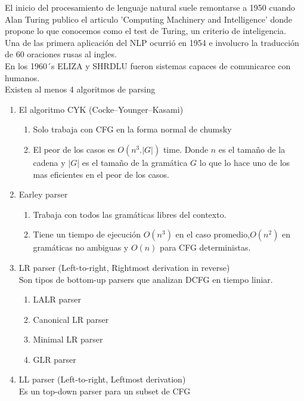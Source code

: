 El inicio del procesamiento de lenguaje natural suele remontarse a 1950 cuando Alan Turing publico el articulo 'Computing Machinery and Intelligence' donde propone lo que conocemos como el test de Turing, un criterio de inteligencia.
\\
Una de las primera aplicación del NLP ocurrió en 1954 e involucro la traducción de 60 oraciones rusas al ingles.
\\
En los 1960´s ELIZA y SHRDLU fueron sistemas capaces de comunicarce con  humanos.
\\
Existen al menos 4 algoritmos de parsing
\begin{enumerate}
    \item El algoritmo CYK (Cocke–Younger–Kasami)
    \begin{enumerate}
        \item Solo trabaja con CFG en la forma normal de chumsky
        \item El peor de los casos es $O(n^3 . |G|)$ time. Donde $n$ es el tamaño de la cadena y $|G|$ es el tamaño de la gramática $G$ lo que lo hace uno de los mas eficientes en el peor de los casos.
    \end{enumerate}
    \item Earley parser
    \begin{enumerate}
        \item Trabaja con todos las gramáticas libres del contexto.
        \item Tiene un tiempo de ejecución $O(n^3)$ en el caso promedio,$O(n^2)$ en gramáticas no ambiguas y $O(n)$ para CFG deterministas.
    \end{enumerate}
    \item LR parser (Left-to-right, Rightmost derivation in reverse)\\
    Son tipos de bottom-up parsers que analizan DCFG en tiempo liniar.
    \begin{enumerate}
        \item LALR parser
        \item Canonical LR parser
        \item Minimal LR parser 
        \item GLR parser
    \end{enumerate}
    
    \item LL parser (Left-to-right, Leftmost derivation)\\
    Es un top-down parser para un subset de CFG
\end{enumerate}